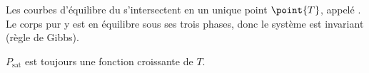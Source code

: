 \begin{propriete}
Les courbes d'équilibre du  s'intersectent en un unique point $\point{T}$, appelé . Le corps pur y est en équilibre sous ses trois phases, donc le système est invariant (règle de Gibbs).
\end{propriete}

\begin{propriete}[admis]
$P_{\mathrm{sat}}$ est toujours une fonction croissante de $T$.
\end{propriete}
